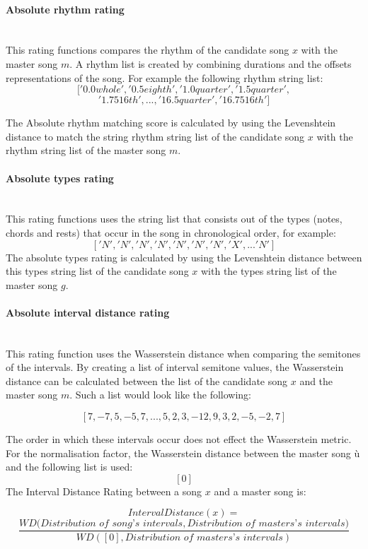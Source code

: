 
\paragraph{Absolute rhythm rating}\mbox{}\\
This rating functions compares the rhythm of the candidate song $x$ with the master song $m$. A rhythm list is created by combining durations and the offsets representations of the song. For example the following rhythm string list:
\[ ['0.0whole', '0.5eighth', '1.0quarter', '1.5quarter',\]
\[ '1.7516th', ... , '16.5quarter', '16.7516th']\]

The Absolute rhythm matching score is calculated by using the Levenshtein distance to match the string rhythm string list of the candidate song $x$ with the rhythm string list of the master song $m$. 

\paragraph{Absolute types rating}\mbox{}\\
This rating functions uses the string list that consists out of the types (notes, chords and rests) that occur in the song in chronological order, for example:
 \[['N', 'N', 'N', 'N', 'N', 'N',  'N', 'X', ... 'N'] \]
The absolute types rating is calculated by using the Levenshtein distance between this types string list of the candidate song $x$ with the types string list of the master song $g$.

\paragraph{Absolute interval distance rating}\mbox{}\\
This rating function uses the Wasserstein distance when comparing the semitones of the intervals. By creating a list of interval semitone values, the Wasserstein distance can be calculated between the list of the candidate song  $x$ and the master song $m$. Such a list would look like the following:

 \[ [7, -7, 5, -5, 7 , ..., 5, 2, 3, -12, 9, 3, 2, -5, -2, 7]\]

 The order in which these intervals occur does not effect the Wasserstein metric. For the normalisation factor, the Wasserstein distance between the master song $ù$ and the following list is used:
  \[ [0]\]
 The Interval Distance Rating between a song $x$ and a master song is:
  
  \[ IntervalDistance(x) = \]
  \[ \frac{WD(\textit{Distribution of song's intervals},\textit{{Distribution of masters's intervals})}} {WD([0],\textit{Distribution of masters's intervals})} \]
  

